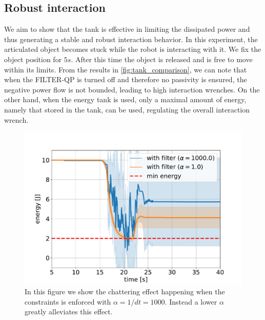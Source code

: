 \subsection{Robust interaction}
We aim to show that the tank is effective in limiting the dissipated power and thus generating a stable and robust interaction behavior. In this experiment, the articulated object becomes stuck while the robot is interacting with it. We fix the object position for $5s$. After this time the object is released and is free to move within its limits. From the results in \fig\ref{fig:tank_comparison}, we can note that when the FILTER-QP is turned off and therefore no passivity is ensured, the negative power flow is not bounded, leading to high interaction wrenches. On the other hand, when the energy tank is used, only a maximal amount of energy, namely that stored in the tank, can be used, regulating the overall interaction wrench.

\begin{figure}[t]
\centering
\includegraphics[width=0.8\columnwidth]{figures/fix_experiment/passivity_as_zbf.pdf}
\caption{In this figure we show the chattering effect happening when the constraints is enforced with $\alpha = 1/dt = 1000$. Instead a lower $\alpha$ greatly alleviates this effect.  }\label{fig:tank_as_zbf}
\end{figure}



